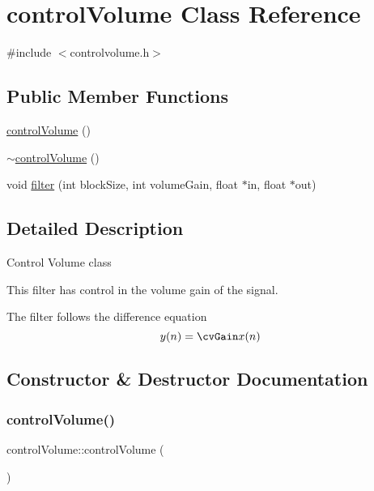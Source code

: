 \hypertarget{classcontrolVolume}{}\section{control\+Volume Class Reference}
\label{classcontrolVolume}


{\ttfamily \#include $<$controlvolume.\+h$>$}

\subsection*{Public Member Functions}
\begin{DoxyCompactItemize}
\item 
\hyperlink{classcontrolVolume_a538c0e5798fb6af3969ea241244a3a7f}{control\+Volume} ()
\item 
\hyperlink{classcontrolVolume_ab5a9d8e84cc9ece689ad435dba3cb1bc}{$\sim$control\+Volume} ()
\item 
void \hyperlink{classcontrolVolume_a8ef56b8cabc733043d207b186e156b12}{filter} (int block\+Size, int volume\+Gain, float $\ast$in, float $\ast$out)
\end{DoxyCompactItemize}


\subsection{Detailed Description}
Control Volume class

This filter has control in the volume gain of the signal.

The filter follows the difference equation \[ y(n)=\cvGain x(n) \] 

\subsection{Constructor \& Destructor Documentation}
\mbox{\label{classcontrolVolume_a538c0e5798fb6af3969ea241244a3a7f}} 
\subsubsection{\texorpdfstring{control\+Volume()}{controlVolume()}}
{\footnotesize\ttfamily control\+Volume\+::control\+Volume (\begin{DoxyParamCaption}{ }\end{DoxyParamCaption})}

